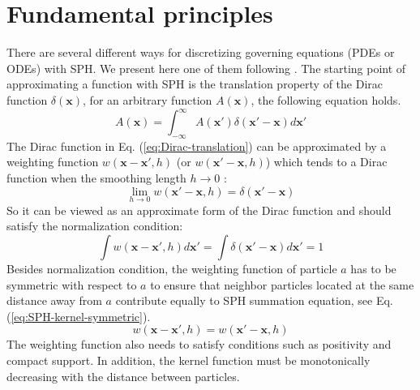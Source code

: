 \section{Fundamental principles}
There are several different ways for discretizing governing equations (PDEs or ODEs) with SPH. We present here one of them following \citet{monaghan1992smoothed, monaghan2005smoothed, monaghan2012smoothed}. The starting point of approximating a function with SPH is the translation property of the Dirac function $\delta(\textbf{x})$, for an arbitrary function $A(\textbf{x})$, the following equation holds. 
\begin{equation}
A\left(\textbf{x}\right)=\int_{-\infty}^{\infty} A\left(\textbf{x} \prime\right) \delta \left(\textbf{x} \prime - \textbf{x}\right) d\textbf{x} \prime
\label{eq:Dirac-translation}
\end{equation}
The Dirac function in Eq. (\ref{eq:Dirac-translation}) can be approximated by a weighting function $w\left(\textbf{x}-\textbf{x}\prime, h\right)$ (or $w\left(\textbf{x}\prime-\textbf{x}, h\right)$) which tends to a Dirac function when the smoothing length $h \rightarrow 0$ :
\begin{equation}
\lim _{h \rightarrow 0} w\left(\textbf{x} \prime-\textbf{x}, h\right) =  \delta \left(\textbf{x} \prime - \textbf{x}\right)
\label{eq:SPH_kernel_delta}
\end{equation}
So it can be viewed as an approximate form of the Dirac function and should satisfy the normalization condition:
\begin{equation}
\int	 w\left(\textbf{x}-\textbf{x}\prime, h\right) d\textbf{x}\prime = \int	 \delta \left(\textbf{x} \prime - \textbf{x}\right) d\textbf{x} \prime =1
\label{eq:SPH-kernel-normalization-prop}
\end{equation}
Besides normalization condition, the weighting function of particle $a$ has to be symmetric with respect to $a$ to ensure that neighbor particles located at the same distance away from $a$ contribute equally to SPH summation equation, see Eq. (\ref{eq:SPH-kernel-symmetric}).
\begin{equation}
w\left(\textbf{x}- \textbf{x} \prime, h\right) = w\left(\textbf{x} \prime - \textbf{x}, h\right)
\label{eq:SPH-kernel-symmetric}
\end{equation}
The weighting function also needs to satisfy conditions such as positivity and compact support. In addition, the kernel function must be monotonically decreasing with the distance between particles.

